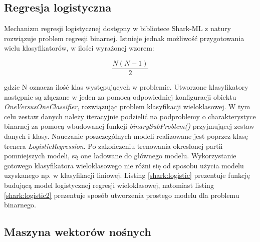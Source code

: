 

\subsection{Regresja logistyczna}

Mechanizm regresji logistycznej dostępny w bibliotece Shark-ML z natury rozwiązuje problem regresji binarnej. Istnieje jednak możliwość przygotowania wielu klasyfikatorów, w ilości wyrażonej wzorem:

\begin{equation}
	\frac{N(N-1)}{2}	
	\label{multiclass}
\end{equation}

gdzie N oznacza ilość klas występujących w problemie. Utworzone klasyfikatory następnie są złączane w jeden za pomocą odpowiedniej konfiguracji obiektu \textit{OneVersusOneClassifier}, rozwiązując problem klasyfikacji wieloklasowej. W tym celu zestaw danych należy iteracyjnie podzielić na podproblemy o charakterystyce binarnej za pomocą wbudowanej funkcji \textit{binarySubProblem()} przyjmującej zestaw danych i klasy. Nauczanie poszczególnych modeli realizowane jest poprzez klasę trenera \textit{LogisticRegression}. Po zakończeniu trenowania okreslonej partii pomniejszych modeli, są one ładowane do głównego modelu. Wykorzystanie gotowego klasyfikatora wieloklasowego nie różni się od sposobu użycia modelu uzyskanego np. w klasyfikacji liniowej. Listing \ref{shark:logistic} prezentuje funkcję budującą model logistycznej regresji wieloklasowej, natomiast listing \ref{shark:logistic2} prezentuje sposób utworzenia prostego modelu dla problemu binarnego.



\subsection{Maszyna wektorów nośnych}

